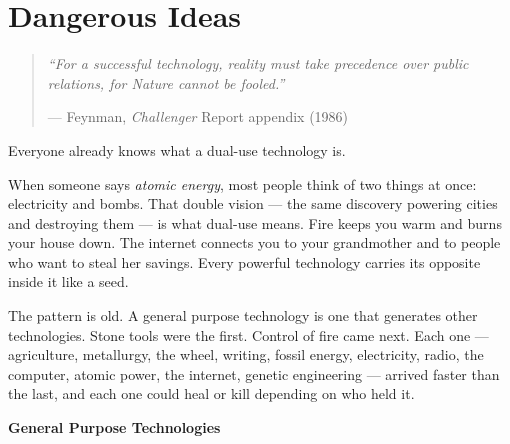 
\chapter{Dangerous Ideas}
\label{pos08:dual-use}

\begin{quote}\small\textit{%
``For a successful technology, reality must take precedence over public relations, for Nature cannot be fooled.''%
}\par\raggedleft --- Feynman, \textit{Challenger} Report appendix (1986)\end{quote}

\vspace{0.5cm}

Everyone already knows what a dual-use technology is.

When someone says \textit{atomic energy}, most people think of two things at once: electricity and bombs. That double vision --- the same discovery powering cities and destroying them --- is what dual-use means. Fire keeps you warm and burns your house down. The internet connects you to your grandmother and to people who want to steal her savings. Every powerful technology carries its opposite inside it like a seed.

The pattern is old. A general purpose technology is one that generates other technologies. Stone tools were the first. Control of fire came next. Each one --- agriculture, metallurgy, the wheel, writing, fossil energy, electricity, radio, the computer, atomic power, the internet, genetic engineering --- arrived faster than the last, and each one could heal or kill depending on who held it.

\vspace{0.5cm}
\begin{center}
\textbf{General Purpose Technologies}
\end{center}
\vspace{0.3cm}

